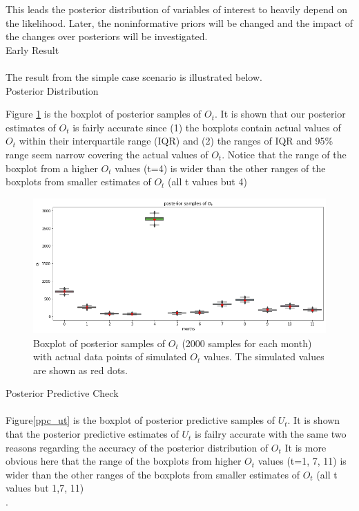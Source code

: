 \documentclass[
10pt, %
a4paper, %
oneside, %
headinclude,footinclude, %
BCOR5mm, %
]{scrartcl}
\begin{document}
This leads the posterior distribution of variables of interest to heavily depend on the likelihood. Later, the noninformative priors will be changed and the impact of the changes over posteriors will be investigated. \\

\Large Early Result \\
\\
\normalsize The result from the simple case scenario is illustrated below.\\

\large Posterior Distribution
 
\normalsize 

Figure \ref{pst_ot} is the boxplot of posterior samples of $O_t$. It is shown that our posterior estimates of  $O_t$ is fairly accurate since (1) the boxplots contain actual values of $O_t$ within their interquartile range (IQR) and (2) the ranges of IQR and 95\% range seem narrow covering the actual values of $O_t$. Notice that the range of the boxplot from a higher $O_t$ values (t=4) is wider than the other ranges of the boxplots from smaller estimates of $O_t$ (all t values but 4)\\

\begin{figure}[h]
	\centering
	\includegraphics[width=1\linewidth]{Figures/earlyresult1_ot.png}
	\caption{Boxplot of posterior samples of $O_t$ (2000 samples for each month) with actual data points of simulated $O_t$ values. The simulated values are shown as red dots.}
	\label{pst_ot}
\end{figure}

\newpage

\large Posterior Predictive Check\\
\normalsize\\
Figure\ref{ppc_ut} is the boxplot of posterior predictive samples of $U_t$. It is shown that the posterior predictive estimates of $U_t$ is failry accurate with the same two reasons regarding the accuracy of the posterior distribution of $O_t$ It is more obvious here that the range of the boxplots from  higher $O_t$ values (t=1, 7, 11) is wider than the other ranges of the boxplots from smaller estimates of $O_t$ (all t values but 1,7, 11)\\.
\end{document}
